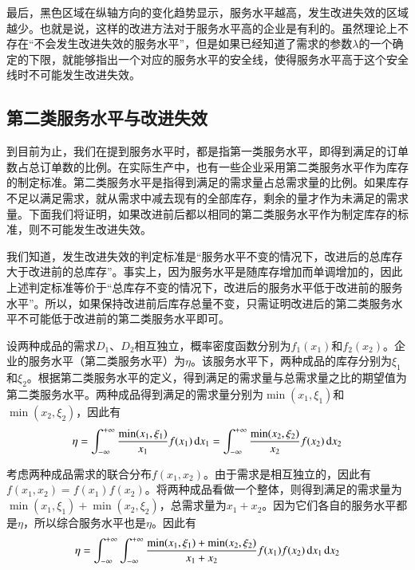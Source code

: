 最后，黑色区域在纵轴方向的变化趋势显示，服务水平越高，发生改进失效的区域越少。也就是说，这样的改进方法对于服务水平高的企业是有利的。虽然理论上不存在“不会发生改进失效的服务水平”，但是如果已经知道了需求的参数$\lambda$的一个确定的下限，就能够指出一个对应的服务水平的安全线，使得服务水平高于这个安全线时不可能发生改进失效。












\subsection{第二类服务水平与改进失效}

到目前为止，我们在提到服务水平时，都是指第一类服务水平，即得到满足的订单数占总订单数的比例。在实际生产中，也有一些企业采用第二类服务水平作为库存的制定标准。第二类服务水平是指得到满足的需求量占总需求量的比例。如果库存不足以满足需求，就从需求中减去现有的全部库存，剩余的量才作为未满足的需求量。下面我们将证明，如果改进前后都以相同的第二类服务水平作为制定库存的标准，则不可能发生改进失效。

我们知道，发生改进失效的判定标准是“服务水平不变的情况下，改进后的总库存大于改进前的总库存”。事实上，因为服务水平是随库存增加而单调增加的，因此上述判定标准等价于“总库存不变的情况下，改进后的服务水平低于改进前的服务水平”。所以，如果保持改进前后库存总量不变，只需证明改进后的第二类服务水平不可能低于改进前的第二类服务水平即可。

设两种成品的需求$D_1$、$D_2$相互独立，概率密度函数分别为$f_1(x_1)$和$f_2(x_2)$。企业的服务水平（第二类服务水平）为$\eta$。该服务水平下，两种成品的库存分别为$\xi_1$和$\xi_2$。根据第二类服务水平的定义，得到满足的需求量与总需求量之比的期望值为第二类服务水平。两种成品得到满足的需求量分别为$\min(x_1,\xi_1)$和$\min(x_2,\xi_2)$，因此有
\[
\eta = \int_{-\infty}^{+\infty}\frac{\min(x_1,\xi_1)}{x_1}f(x_1)\operatorname{d\!} x_1 = \int_{-\infty}^{+\infty}\frac{\min(x_2,\xi_2)}{x_2}f(x_2)\operatorname{d\!} x_2
\]

考虑两种成品需求的联合分布$f(x_1,x_2)$。由于需求是相互独立的，因此有$f(x_1,x_2)=f(x_1)f(x_2)$。将两种成品看做一个整体，则得到满足的需求量为$\min(x_1,\xi_1)+\min(x_2,\xi_2)$，总需求量为$x_1+x_2$。因为它们各自的服务水平都是$\eta$，所以综合服务水平也是$\eta$。因此有
\begin{equation}
\eta = \int_{-\infty}^{+\infty}\int_{-\infty}^{+\infty}\frac{\min(x_1,\xi_1)+\min(x_2,\xi_2)}{x_1+x_2}f(x_1)f(x_2)\operatorname{d\!} x_1 \operatorname{d\!} x_2
\label{eq:合并前第二类服务水平}
\end{equation}

